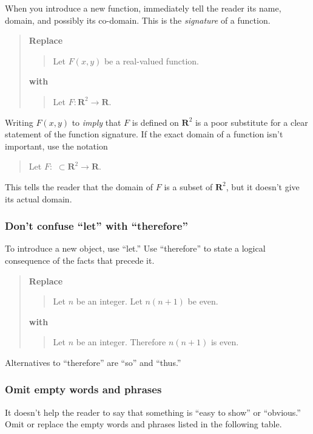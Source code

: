 \documentclass[12pt]{article}
\newcounter{ex}\setcounter{ex}{0}
\newcounter{se}\setcounter{se}{0}
\begin{document}
When you introduce a new function, immediately tell the reader its 
name, domain, and possibly its co-domain. This is the \emph{signature}
of a function.
\begin{quote}
\textbf{\textbf{Replace}}
\begin{quote}
Let \(F(x,y)\) be a real-valued function.
\end{quote}
\textbf{with}
\begin{quote}
Let \(F : \mathbf{R}^2 \to \mathbf{R}\).
\end{quote}
\end{quote}
Writing \(F(x,y)\) to \emph{imply} that \(F\) is defined
on \( \mathbf{R}^2\) is a poor substitute for a clear statement of 
the function signature. If the exact domain of a function isn't 
important, use the notation
\begin{quote}
Let \(F :\,\, \subset \mathbf{R}^2 \to \mathbf{R}\).
\end{quote}
This tells the reader that the domain of \(F\) is a subset
of \(\mathbf{R}^2\), but it doesn't give its actual domain.


 \subsubsection{ Don't confuse ``let'' with ``therefore''}

To introduce a new object, use ``let.''  Use ``therefore'' to
state a logical consequence of the facts that precede it.


\begin{quote}
\textbf{\textbf{Replace}}
\begin{quote}
  Let \(n\) be an integer. Let \(n (n+1)\) be even.
\end{quote}
\textbf{with}
\begin{quote}
Let \(n\) be an integer.  Therefore \(n (n+1)\) is even.
\end{quote}
\end{quote}
Alternatives to ``therefore'' are ``so'' and ``thus.''


 \subsubsection{  Omit empty words and phrases} 

It doesn't help the reader to say that something is 
``easy to show'' or ``obvious.'' Omit or replace
the empty words and phrases listed in the following table.
\end{document}
